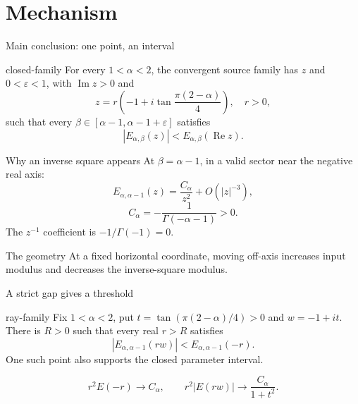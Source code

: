 \documentclass{beamer}
\begin{document}
\section{Mechanism}
\begin{frame}{Main conclusion: one point, an interval}
\begin{bookresult}{closed-family}
For every $1{<} \alpha{<} 2$, the convergent source family has $z$ and $0{<} \varepsilon{<} 1$, with $\operatorname{Im}z>0$ and
\[
z=r\left(-1+i\tan\frac{\pi(2-\alpha)}4\right),\quad r>0,
\]
such that every $\beta\in[\alpha-1,\alpha-1+\varepsilon]$ satisfies
\[
|E_{\alpha,\beta}(z)|{<} E_{\alpha,\beta}(\operatorname{Re}z).
\]
\end{bookresult}
\end{frame}
\begin{frame}{Why an inverse square appears}
At $\beta=\alpha-1$, in a valid sector near the negative real axis:
\[
E_{\alpha,\alpha-1}(z)=\frac{C_\alpha}{z^2}+O(|z|^{-3}),
\]
\[
C_\alpha=-\frac1{\Gamma(-\alpha-1)}>0.
\]
The $z^{-1}$ coefficient is $-1/\Gamma(-1)=0$.
\begin{block}{The geometry}
At a fixed horizontal coordinate, moving off-axis increases input modulus and decreases the inverse-square modulus.
\end{block}
\end{frame}
\begin{frame}{A strict gap gives a threshold}
\begin{bookresult}{ray-family}
Fix $1{<} \alpha{<} 2$, put $t=\tan(\pi(2-\alpha)/4)>0$ and $w=-1+it$. There is $R>0$ such that every real $r>R$ satisfies
\[
|E_{\alpha,\alpha-1}(rw)|{<} E_{\alpha,\alpha-1}(-r).
\]
One such point also supports the closed parameter interval.
\end{bookresult}
\[
r^2 E(-r)\to C_\alpha,\qquad r^2|E(rw)|\to\frac{C_\alpha}{1+t^2}.
\]
\end{frame}
\end{document}
